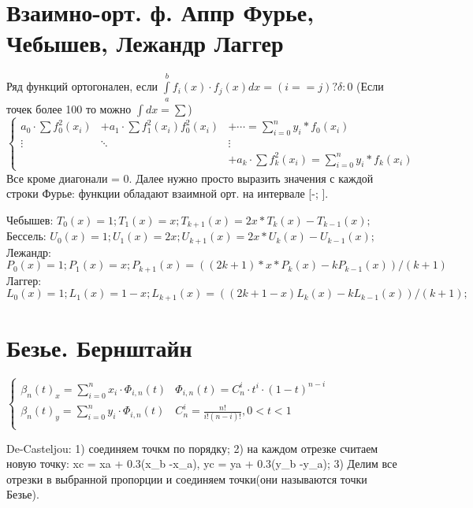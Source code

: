 \documentclass{article}
\begin{document}
\section{Взаимно-орт. ф. Аппр Фурье, Чебышев, Лежандр Лаггер}
Ряд функций ортогонален, если $\int\limits_{a}^bf_i(x) \cdot f_j(x) dx =
(i==j)? \delta : 0$ (Если точек более 100 то можно $\int dx = \sum $)\\
\begin{math}
\left\{
\begin{array}{lll}
  a_0 \cdot \sum f_0^2(x_i) &+ a_1 \cdot \sum f_1^2(x_i) f_0^2(x_i) &+ \cdots
  = \sum \limits_{i=0}^n y_i*f_0(x_i)\\
  \vdots  &\ddots &\vdots \\
  &  &+ a_k \cdot \sum f_k^2(x_i) = \sum \limits_{i=0}^n y_i*f_k(x_i)
\end{array}
\end{math}
Все кроме диагонали = 0. Далее нужно просто выразить значения с каждой строки
Фурье: функции обладают взаимной орт. на интервале [-\pi; \pi].

Чебышев: $T_0(x)=1; T_1(x)=x; T_{k+1}(x)=2x* T_k(x) - T_{k-1}(x);$\\
Бессель: $U_0(x)=1; U_1(x)=2x; U_{k+1}(x)=2x * U_k(x) - U_{k-1}(x); $\\
Лежандр: $P_0(x)=1; P_1(x)=x; P_{k+1}(x)=((2k+1)*x*P_k(x) -kP_{k-1}(x))/(k+1)$\\
Лаггер: $L_0(x)=1; L_1(x)=1-x; L_{k+1}(x)=((2k+1-x)L_k(x) -kL_{k-1}(x))/(k+1);$\\

\section{Безье. Бернштайн}
\begin{math}
\left\{
\begin{array}{ll}
  \beta_n(t)_x = \sum\limits_{i=0}^nx_i \cdot \Phi_{i,n}(t)& \Phi_{i,n}(t) =
  C_n^i \cdot t^i \cdot (1-t)^{n-i}\\
  \beta_n(t)_y = \sum\limits_{i=0}^ny_i \cdot \Phi_{i,n}(t)& C_n^i =
  \frac{n!}{i!(n-i)!}, 0 < t < 1\\
\end{array}
\end{math}

De-Casteljou: 1) соединяем точкм по порядку; 2) на каждом отрезке считаем новую
точку: xc = xa + 0.3(x_b -x_a), yc = ya + 0.3(y_b -y_a); 3) Делим все отрезки в
выбранной пропорции и соединяем точки(они называются точки Безье).
\end{document}
